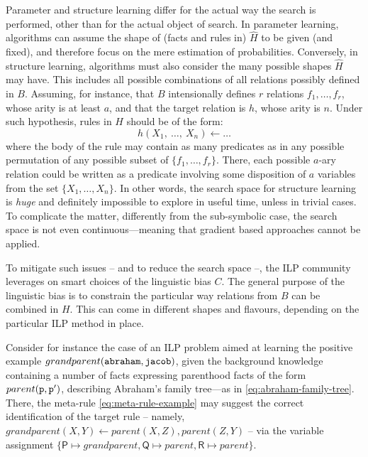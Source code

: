 \documentclass[12pt,a4paper,openright,twoside]{book}
\begin{document}
Parameter and structure learning differ for the actual way the search is performed, other than for the actual object of search.
%
In parameter learning, algorithms can assume the shape of (facts and rules in) $\hat{H}$ to be given (and fixed), and therefore focus on the mere estimation of probabilities.
%
Conversely, in structure learning, algorithms must also consider the many possible shapes $\hat{H}$ may have.
%
This includes all possible combinations of all relations possibly defined in $B$.
%
Assuming, for instance, that $B$ intensionally defines $r$ relations $f_1, \ldots, f_r$, whose arity is at least $a$, and that the target relation is $h$, whose arity is $n$.
%
Under such hypothesis, rules in $H$ should be of the form:
%
\begin{equation*}
    h(X_1,\ \ldots,\ X_n) \leftarrow \ldots
\end{equation*}
%
where the body of the rule may contain as many predicates as in any possible permutation of any possible subset of $\{ f_1, \ldots, f_r \}$.
%
There, each possible $a$-ary relation could be written as a predicate involving some disposition of $a$ variables from the set $\{ X_1, \ldots, X_n \}$.
%
In other words, the search space for structure learning is \emph{huge} and definitely impossible to explore in useful time, unless in trivial cases.
%
To complicate the matter, differently from the sub-symbolic case, the search space is not even continuous---meaning that gradient based approaches cannot be applied.

To mitigate such issues -- and to reduce the search space --, the ILP community leverages on smart choices of the linguistic bias $C$.
%
The general purpose of the linguistic bias is to constrain the particular way relations from $B$ can be combined in $H$.
%
This can come in different shapes and flavours, depending on the particular ILP method in place.

Consider for instance the case of an ILP problem aimed at learning the positive example $grandparent(\mathtt{abraham}, \mathtt{jacob})$, given the background knowledge containing a number of facts expressing parenthood facts of the form $parent(\mathtt{p}, \mathtt{p}')$, describing Abraham's family tree---as in \cref{eq:abraham-family-tree}.
%
There, the meta-rule \ref{eq:meta-rule-example} may suggest the correct identification of the target rule -- namely, $grandparent(X, Y) \leftarrow parent(X, Z), parent(Z, Y)$ -- via the variable assignment $\{ \textsf{P} \mapsto grandparent, \textsf{Q} \mapsto parent, \textsf{R} \mapsto parent \}$.
\end{document}
